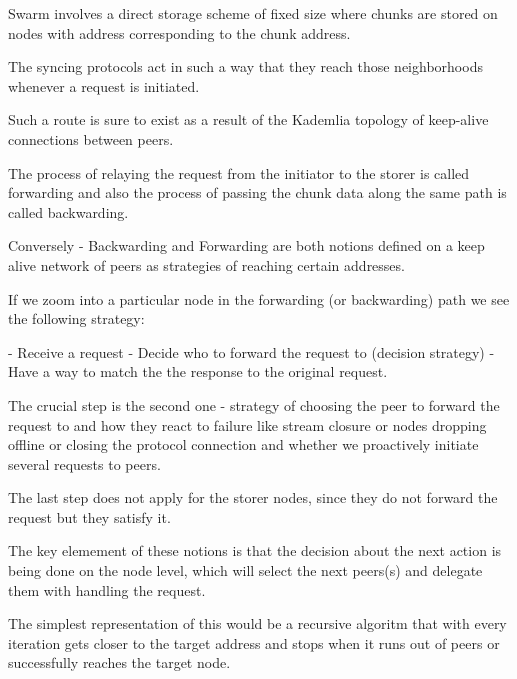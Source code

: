 
Swarm involves a direct storage scheme of fixed size where chunks are stored on nodes with address corresponding to the chunk address.

The syncing protocols act in such a way that they reach those neighborhoods whenever a request is initiated.

Such a route is sure to exist as a result of the Kademlia topology of keep-alive connections between peers.

The process of relaying the request from the initiator to the storer is called forwarding and also the process of passing the chunk data along the same path is called backwarding.

Conversely - Backwarding and Forwarding are both notions defined on a keep alive network of peers as strategies of reaching certain addresses.

If we zoom into a particular node in the forwarding (or backwarding) path we see the following strategy:

- Receive a request
- Decide who to forward the request to (decision strategy)
- Have a way to match the the response to the original request.

The crucial step is the second one - strategy of choosing the peer to forward the request to and how they react to failure like stream closure or nodes dropping offline or closing the protocol connection and whether we proactively initiate several requests to peers.

The last step does not apply for the storer nodes, since they do not forward the request but they satisfy it.

The key elemement of these notions is that the decision about the next action is being done on the node level, which will select the next peers(s) and delegate them with handling the request.

The simplest representation of this would be a recursive algoritm that with every iteration gets closer to the target address and stops when it runs out of peers or successfully reaches the target node.


